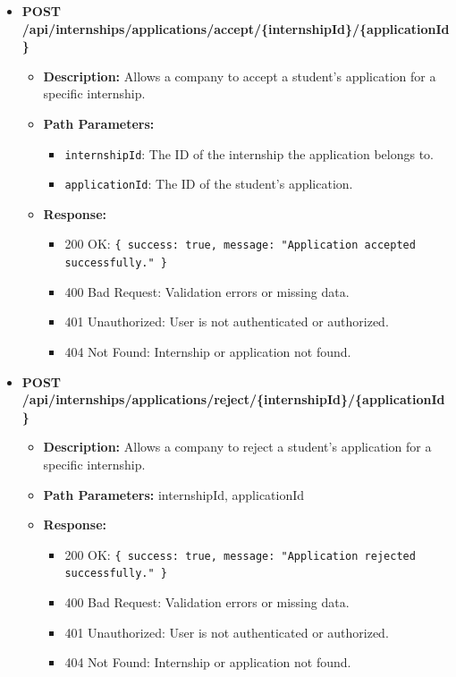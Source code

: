 \begin{itemize}
    \item \textbf{POST /api/internships/applications/accept/\{internshipId\}/\{applicationId\}}  
    \begin{itemize}
        \item \textbf{Description:} Allows a company to accept a student's application for a specific internship.
        \item \textbf{Path Parameters:}  
        \begin{itemize}
            \item \texttt{internshipId}: The ID of the internship the application belongs to.
            \item \texttt{applicationId}: The ID of the student's application.
        \end{itemize}
        \item \textbf{Response:}
        \begin{itemize}
            \item 200 OK: \texttt{\{ success: true, message: "Application accepted successfully." \}}
            \item 400 Bad Request: Validation errors or missing data.
            \item 401 Unauthorized: User is not authenticated or authorized.
            \item 404 Not Found: Internship or application not found.
        \end{itemize}
    \end{itemize}

    \item \textbf{POST /api/internships/applications/reject/\{internshipId\}/\{applicationId\}}  
    \begin{itemize}
        \item \textbf{Description:} Allows a company to reject a student's application for a specific internship.
        \item \textbf{Path Parameters:} internshipId, applicationId  
        \item \textbf{Response:}
        \begin{itemize}
            \item 200 OK: \texttt{\{ success: true, message: "Application rejected successfully." \}}
            \item 400 Bad Request: Validation errors or missing data.
            \item 401 Unauthorized: User is not authenticated or authorized.
            \item 404 Not Found: Internship or application not found.
        \end{itemize}
    \end{itemize}



\end{itemize}
